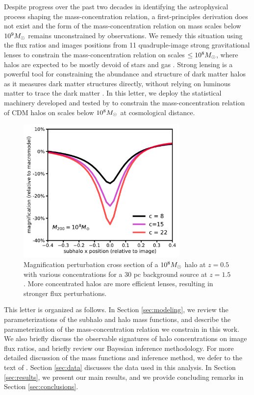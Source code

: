 Despite progress over the past two decades in identifying the astrophysical process shaping the mass-concentration relation, a first-principles derivation does not exist and the form of the mass-concentration relation on mass scales below $10^{9} {M_{\odot}}$ remains unconstrained by observations. We remedy this situation using the flux ratios and images positions from 11 quadruple-image strong gravitational lenses to constrain the mass-concentration relation on scales $\leq 10^{8} {M_{\odot}}$, where halos are expected to be mostly devoid of stars and gas \cite{Sawala++15}. Strong lensing is a powerful tool for constraining the abundance and structure of dark matter halos as it measures dark matter structures directly, without relying on luminous matter to trace the dark matter \cite{D+K02,Veg++14,Nierenberg++14,Birrer++17a,Hsueh++19,Gilman++19b}. In this letter, we deploy the statistical machinery developed and tested by \cite{Gilman++19} to constrain the mass-concentration relation of CDM halos on scales below $10^8 {M_{\odot}}$ at cosmological distance. 
\begin{figure}
	\centering
	\includegraphics[clip,trim=0cm 0cm 0cm
	0cm,width=0.75\textwidth,keepaspectratio]{./figures_mcrelation/concentration_cross_section.pdf}
	\caption[Magnification cross section as a function of halo concentration]{\label{fig:cross} Magnification perturbation cross section of a $10^{8} {M_{\odot}}$ halo at $z=0.5$ with various concentrations for a 30 pc background source at $z=1.5$. More concentrated halos are more efficient lenses, resulting in stronger flux perturbations.}
\end{figure}	

This letter is organized as follows. In Section \ref{sec:modeling}, we review the parameterizations of the subhalo and halo mass functions, and describe the parameterization of the mass-concentration relation we constrain in this work. We also briefly discuss the observable signatures of halo concentrations on image flux ratios, and briefly review our Bayesian inference methodology. For more detailed discussion of the mass functions and inference method, we defer to the text of \cite{Gilman++19b}. Section \ref{sec:data} discusses the data used in this analysis. In Section \ref{sec:results}, we present our main results, and we provide concluding remarks in Section \ref{sec:conclusions}. 

